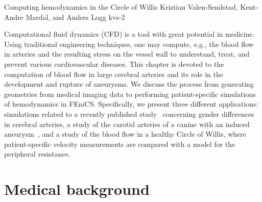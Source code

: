               {Computing hemodynamics in the Circle of Willis}
              {Kristian Valen-Sendstad, Kent-Andre Mardal, and Anders Logg}
              {kvs-2}

Computational fluid dynamics (CFD) is a tool with great potential in
medicine. Using traditional engineering techniques, one may compute,
e.g., the blood flow in arteries and the resulting stress on the
vessel wall to understand, treat, and prevent various cardiovascular
diseases. This chapter is devoted to the computation of blood flow in
large cerebral arteries and its role in the development and rupture of
aneurysms. We discuss the process from generating geometries from
medical imaging data to performing patient-specific simulations of
hemodynamics in FEniCS.  Specifically, we present three different
applications: simulations related to a recently published
study~\cite{IsaksenValen-SendstadMardalEtAl2008-sex} concerning gender differences in cerebral
arteries, a study of the carotid arteries of a canine with an induced
aneurysm~\cite{JiangJohnsonValen-SendstadEtAl2010}, and a study of the blood flow in a healthy
Circle of Willis, where patient-specific velocity measurements are
compared with a model for the peripheral resistance.

\section{Medical background} \label{Medical_Background}

